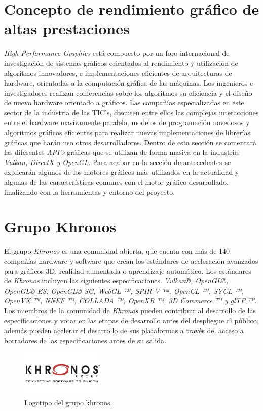 \documentclass[a4paper]{book}
\begin{document}
\section{Concepto de rendimiento gráfico de altas prestaciones}
\label{sec:HPG}

\textit{High Performance Graphics} \cite{HPG:assoc} está compuesto por un foro internacional de investigación de sistemas gráficos
orientados al rendimiento y utilización de algoritmos innovadores, e implementaciones eficientes de arquitecturas
de hardware, orientadas a la computación gráfica de las máquinas. Los ingenieros e investigadores realizan conferencias
sobre los algoritmos su eficiencia y el diseño de nuevo hardware orientado a gráficos. Las compañías especializadas
en este sector de la industria de las TIC’s, discuten entre ellos las complejas interacciones entre el hardware masívamente
paralelo, modelos de programación novedosos y algoritmos gráficos eficientes para realizar nuevas implementaciones de
librerías gráficas que harán uso otros desarrolladores. Dentro de esta sección se comentará las diferentes \textit{API’s}
gráficas que se utilizan de forma masiva en la industria: \textit{Vulkan, DirectX y OpenGL}. Para acabar en la sección de
antecedentes se explicarán algunos de los motores gráficos más utilizados en la actualidad y algunas de las características
comunes con el motor gráfico desarrollado, finalizando con la herramientas y entorno del proyecto.

\section{Grupo Khronos}
\label{sec:Grupo Khronos}

El grupo \textit{Khronos} es una comunidad abierta, que cuenta con más de 140 compañías hardware y software que crean los estándares de
aceleración avanzados para gráficos 3D, realidad aumentada o aprendizaje automático. Los estándares de \textit{Khronos} incluyen las
siguientes especificaciones.  \textit{Vulkan®, OpenGL®, OpenGL® ES, OpenGL® SC, WebGL ™, \textit{SPIR-V} ™, OpenCL ™, SYCL ™, OpenVX ™,
NNEF ™, COLLADA ™, OpenXR ™, 3D Commerce ™ y glTF ™}. Los miembros de la comunidad de \textit{Khronos} pueden contribuir al desarrollo
de las especificaciones y votar en las etapas de desarrollo antes del despliegue al público, además pueden acelerar el desarrollo
de sus plataformas a través del acceso a borradores de las especificaciones antes de su salida.

\begin{figure}[H]
    \centering
    \includegraphics[width=4cm, keepaspectratio]{img/khronos.jpg}
    \caption{Logotipo del grupo khronos.}
    \label{khronos}
\end{figure}
\end{document}
